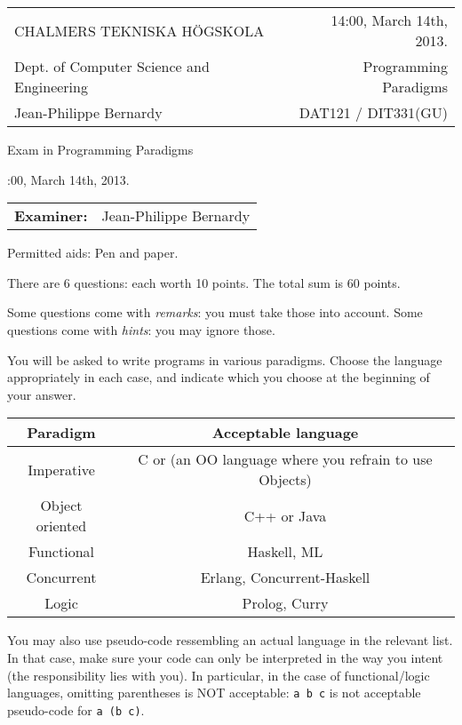 \documentclass{article}
\begin{document}
\setlength{\parskip}{2pt} 

\newcommand{\examtime}{14:00, March 14th, 2013}
\newcommand{\points}[1]{\marginpar{\bf #1 points}}
\noindent
\begin{tabular}{lr}
CHALMERS TEKNISKA H\"OGSKOLA &\examtime{}.\\
Dept. of Computer Science and Engineering & Programming Paradigms\\
Jean-Philippe Bernardy                 & DAT121 / DIT331(GU) \\
\end{tabular}

\vspace{2.5cm} \noindent
\begin{center} {\LARGE
Exam in Programming Paradigms}
\end{center}

\vspace{1.5cm}

\noindent
\examtime{}.\\
\begin{tabular}{ll}
\textbf{Examiner:} & Jean-Philippe Bernardy
\end{tabular}
\vspace{1cm}

\noindent
Permitted aids: Pen and paper. 

There are 6 questions: each worth 10 points. The total sum is 60
points.  

Some questions come with \emph{remarks}: you must take those
into account.  Some questions come with \emph{hints}: you may ignore
those.

You will be asked to write programs in various paradigms. Choose the
language appropriately in each case, and indicate which you choose at
the beginning of your answer.

\begin{tabular}[p]{cc}
  Paradigm & Acceptable language \\ \hline
  Imperative   & C or (an OO language where you refrain to use Objects) \\
  Object oriented & C++ or Java \\
  Functional & Haskell, ML \\
  Concurrent & Erlang, Concurrent-Haskell \\
  Logic & Prolog, Curry 
\end{tabular}

You may also use pseudo-code ressembling an actual language in the
relevant list. In that case, make sure your code can only be
interpreted in the way you intent (the responsibility lies with
you). In particular, in the case of functional/logic languages,
omitting parentheses is NOT acceptable: \texttt{a b c} is not
acceptable pseudo-code for \texttt{a (b c)}.
\end{document}
